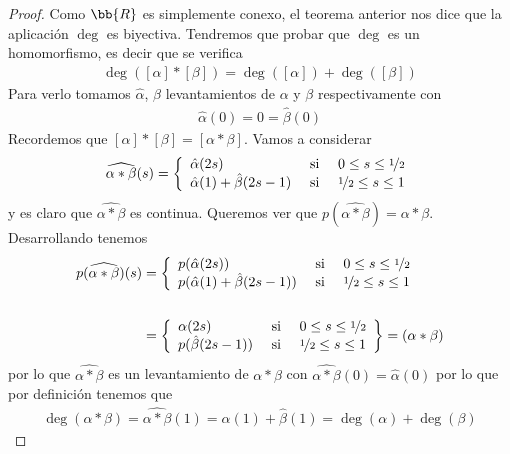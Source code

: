 \begin{teo}
    \begin{proof}
        Como $\bb{R}$ es simplemente conexo, el teorema anterior nos dice que  la aplicación $\deg$ es biyectiva. Tendremos que probar que $\deg$ es un homomorfismo, es decir que se verifica
        \begin{gather*}
            \deg([\alpha] \ast [\beta]) = \deg([\alpha]) + \deg([\beta])
        \end{gather*}
        Para verlo tomamos $\hat{\alpha}$, $\hat{\beta}$ levantamientos de $\alpha$ y $\beta$ respectivamente con 
        \begin{gather*}
            \hat{\alpha}(0) = 0 = \hat{\beta}(0)
        \end{gather*}
        Recordemos que $[\alpha] \ast [\beta] = [\alpha \ast \beta]$. Vamos a considerar
        \begin{gather*}
            \widehat{\alpha \ast \beta}(s) = \left\{
                \begin{array}{l c c}
                    \hat{\alpha}(2s) & \text{ si } & 0 \leq s \leq \nicefrac{1}{2}\\
                    \hat{\alpha}(1) + \hat{\beta}(2s-1) & \text{ si } &\nicefrac{1}{2} \leq s \leq 1
                \end{array}
            \right.
        \end{gather*}
        y es claro que $\widehat{\alpha \ast \beta}$ es continua. Queremos ver que $p(\widehat{\alpha\ast \beta}) = \alpha \ast \beta$. Desarrollando tenemos 
        \begin{align*}
            p(\widehat{\alpha \ast \beta})(s) &= \left\{
                \begin{array}{l c c}
                    p(\hat{\alpha}(2s)) & \text{ si } & 0 \leq s \leq \nicefrac{1}{2}\\
                    p(\hat{\alpha}(1) + \hat{\beta}(2s-1)) & \text{ si } &\nicefrac{1}{2} \leq s \leq 1
                \end{array}
            \right.\\\\
            &= \left\{
                \begin{array}{l c c}
                    \alpha(2s) & \text{ si } & 0 \leq s \leq \nicefrac{1}{2}\\
                    p(\hat{\beta}(2s-1)) & \text{ si } &\nicefrac{1}{2} \leq s \leq 1
                \end{array}
            \right\} = (\alpha \ast \beta)
        \end{align*}
        por lo que $\hat{\alpha\ast\beta}$ es un levantamiento de $\alpha \ast \beta$ con $\hat{\alpha \ast \beta}(0) = \hat{\alpha}(0)$ por lo que por definición tenemos que 
        \begin{gather*}
            \deg(\alpha \ast \beta) = \widehat{\alpha \ast \beta}(1) = \hat{\alpha}(1) + \hat{\beta}(1) = \deg(\alpha) + \deg(\beta)
        \end{gather*}
    \end{proof}
\end{teo}

